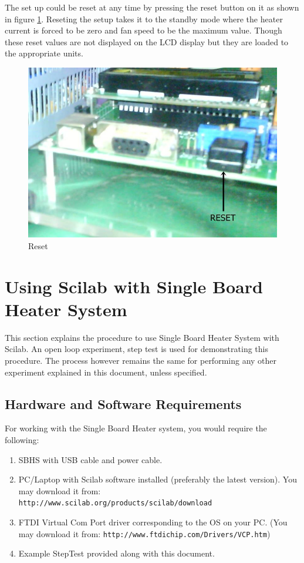 \documentclass[12pt]{report}
\begin{document}
The set up could be reset at any time by pressing the reset button on it as shown in figure \ref{reset}. Reseting the setup takes it to the standby mode where the heater current is forced to be zero and fan speed to be the maximum value. Though these reset values are not displayed on the LCD display but they are loaded to the appropriate units. 
\begin{figure}
\centering
\includegraphics[width=0.5\linewidth]{r.jpg}
\caption{Reset}
\label{reset}
\end{figure}
\chapter{Using Scilab with Single Board Heater System}\label{sercomm}
This section explains the procedure to use Single Board Heater System with Scilab. An open loop experiment, step test is used for demonstrating this procedure. The process however remains the same for performing any other experiment explained in this document, unless specified. 
\section*{Hardware and Software Requirements}\label{umlauts}
For working with the Single Board Heater system, you would require the following:

\begin{enumerate}
\item SBHS with USB cable and power cable.
\item PC/Laptop with Scilab software installed (preferably the latest version). You may download it from:\\ {\tt http://www.scilab.org/products/scilab/download}
\item FTDI Virtual Com Port driver corresponding to the OS on your PC. (You may download it from: 
{\tt http://www.ftdichip.com/Drivers/VCP.htm})
\item Example StepTest provided along with this document.
\end{enumerate}
\end{document}
